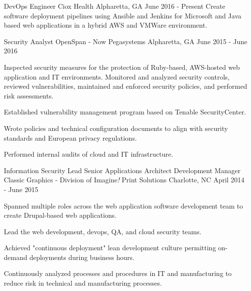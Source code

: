 


\begin{cventries}


\cventry
{DevOps Engineer}
{Ciox Health}
{Alpharetta, GA}
{June 2016 - Present}
{ %
Create software deployment pipelines using Ansible and Jenkins for Microsoft and Java based web applications in a hybrid AWS and VMWare environment.
}


\cventry
{Security Analyst}
{OpenSpan - Now Pegasystems}
{Alpharetta, GA}
{June 2015 - June 2016}
{ %
Inspected security measures for the protection of Ruby-based, AWS-hosted web application and IT environments. Monitored and analyzed security controls, reviewed vulnerabilities, maintained and enforced security policies, and performed risk assessments.
\begin{cvitems}
\item[]
\item {Established vulnerability management program based on Tenable SecurityCenter.}
\item {Wrote policies and technical configuration documents to align with security standards and European privacy regulations.}
\item {Performed internal audits of cloud and IT infrastructure.}
\end{cvitems}
}


\cventry
{Information Security Lead
Senior Applications Architect
Development Manager}
{Classic Graphics - Division of Imagine{\it !} Print Solutions} %
{Charlotte, NC} %
{April 2014 - June 2015} %
{
Spanned multiple roles across the web application software development team to create Drupal-based web applications.
\begin{cvitems}
\item[]
\item {Lead the web development, devops, QA, and cloud security teams.}
\item {Achieved "continuous deployment" lean development culture permitting on-demand deployments during business hours.}
\item {Continuously analyzed processes and procedures in IT and manufacturing to reduce risk in technical and manufacturing processes.}
\end{cvitems}
}


\end{cventries}
